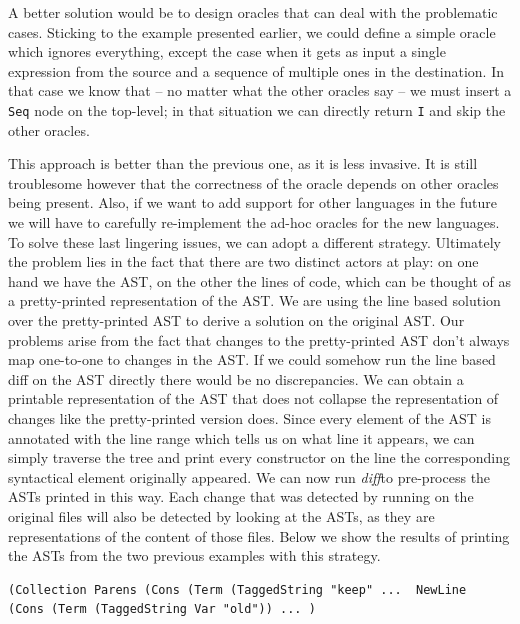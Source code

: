 \documentclass[11pt, titlepage]{article}
\newcommand{\toHaskell}[1]{\texttt{#1}\xspace}
\newcommand{\diff}{\emph{diff}}
\begin{document}
A better solution would be to design oracles that can deal with the problematic cases. 
Sticking to the example presented earlier, we could define a simple oracle which ignores everything, except the case when it gets as input a single expression from the source and a sequence of multiple ones in the destination. In that case we know that -- no matter what the other oracles say -- we must insert a \toHaskell{Seq} node on the top-level; in that situation we can directly return \toHaskell{I} and skip the other oracles. 

This approach is better than the previous one, as it is less invasive. It is still troublesome however that the correctness of the oracle depends on other oracles being present. Also, if we want to add support for other languages in the future we will have to carefully re-implement the ad-hoc oracles for the new languages. To solve these last lingering issues, we can adopt a different strategy. 
Ultimately the problem lies in the fact that there are two distinct actors at play: on one hand we have the AST, on the other the lines of code, which can be thought of as a pretty-printed representation of the AST. We are using the line based solution over the pretty-printed AST to derive a solution on the original AST. Our problems arise from the fact that changes to the pretty-printed AST don't always map one-to-one to changes in the AST. If we could somehow run the line based diff on the AST directly there would be no discrepancies.
We can obtain a printable representation of the AST that does not collapse the representation of changes like the pretty-printed version does. Since every element of the AST is annotated with the line range which tells us on what line it appears, we can simply traverse the tree and print every constructor on the line the corresponding syntactical element originally appeared.
We can now run \diff to pre-process the ASTs printed in this way. Each change that was detected by running on the original files will also be detected by looking at the ASTs, as they are representations of the content of those files. 
Below we show the results of printing the ASTs from the two previous examples with this strategy.

\vspace{.6em}
\begin{minipage}{0.95\textwidth}
\begin{verbatim}
(Collection Parens (Cons (Term (TaggedString "keep" ...  NewLine
(Cons (Term (TaggedString Var "old")) ... )
\end{verbatim}
\end{minipage}
\end{document}
